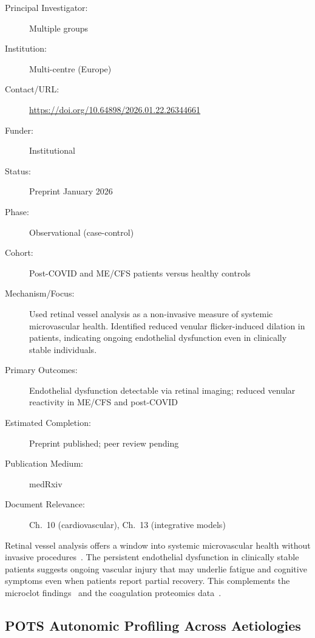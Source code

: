 \begin{description}
    \item[Principal Investigator:] Multiple groups
    \item[Institution:] Multi-centre (Europe)
    \item[Contact/URL:] \url{https://doi.org/10.64898/2026.01.22.26344661}
    \item[Funder:] Institutional
    \item[Status:] Preprint January 2026
    \item[Phase:] Observational (case-control)
    \item[Cohort:] Post-COVID and ME/CFS patients versus healthy controls
    \item[Mechanism/Focus:] Used retinal vessel analysis as a non-invasive
        measure of systemic microvascular health.  Identified reduced venular
        flicker-induced dilation in patients, indicating ongoing endothelial
        dysfunction even in clinically stable individuals.
    \item[Primary Outcomes:] Endothelial dysfunction detectable via retinal
        imaging; reduced venular reactivity in ME/CFS and post-COVID
    \item[Estimated Completion:] Preprint published; peer review pending
    \item[Publication Medium:] medRxiv
    \item[Document Relevance:] Ch.~10 (cardiovascular), Ch.~13 (integrative
        models)
\end{description}

Retinal vessel analysis offers a window into systemic microvascular health
without invasive procedures~\cite{MicrovascularRemodeling2026}.  The
persistent endothelial dysfunction in clinically stable patients suggests
ongoing vascular injury that may underlie fatigue and cognitive symptoms
even when patients report partial recovery.  This complements the microclot
findings~\cite{Nunes2022microclots} and the coagulation proteomics
data~\cite{CoagulationProteomics2024}.

\subsection{POTS Autonomic Profiling Across Aetiologies}
\label{sec:registry-pots-profiling}

